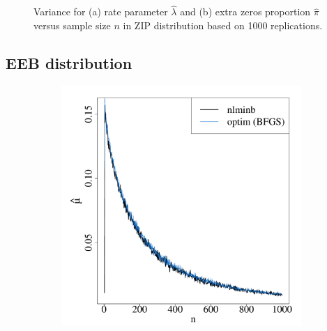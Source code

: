 \documentclass[nojss]{jss}
\begin{document}
\begin{appendix}
\begin{figure}[h]
\begin{subfigure}[h]{0.49\textwidth}
        \caption{\label{fig:varZIPb}}
    \end{subfigure}
\caption{\label{fig:varZIP} Variance for (a) rate parameter $\hat{\lambda}$ and (b) extra zeros proportion $\hat{\pi}$ versus sample size $n$ in ZIP distribution based on 1000 replications.}
\vspace{-20pt}
\end{figure}

\subsection{EEB distribution}




\begin{figure}[H]
  \vspace{-60pt}
  \centering
    \begin{subfigure}[h]{0.49\textwidth}
        \includegraphics[width=\textwidth]{article-varEEBa}
        \caption{\label{fig:varEEBa}}
    \end{subfigure}
    \begin{subfigure}[h]{0.49\textwidth}

\end{subfigure}
\end{figure}
\end{appendix}
\end{document}
